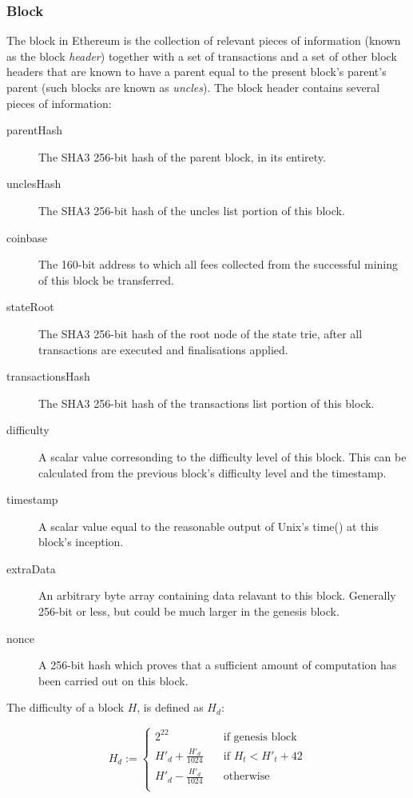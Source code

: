 \documentclass[9pt,oneside]{amsart}
\begin{document}
\begin{multicols}{2}
\subsubsection{Block} \label{ch:block}

The block in Ethereum is the collection of relevant pieces of information (known as the block \textit{header}) together with a set of transactions and a set of other block headers that are known to have a parent equal to the present block's parent's parent (such blocks are known as \textit{uncles}). The block header contains several pieces of information:

\begin{description}
\item[parentHash] The SHA3 256-bit hash of the parent block, in its entirety.
\item[unclesHash] The SHA3 256-bit hash of the uncles list portion of this block.
\item[coinbase] The 160-bit address to which all fees collected from the successful mining of this block be transferred.
\item[stateRoot] The SHA3 256-bit hash of the root node of the state trie, after all transactions are executed and finalisations applied.
\item[transactionsHash] The SHA3 256-bit hash of the transactions list portion of this block.
\item[difficulty] A scalar value corresonding to the difficulty level of this block. This can be calculated from the previous block's difficulty level and the timestamp.
\item[timestamp] A scalar value equal to the reasonable output of Unix's time() at this block's inception.
\item[extraData] An arbitrary byte array containing data relavant to this block. Generally 256-bit or less, but could be much larger in the genesis block.
\item[nonce] A 256-bit hash which proves that a sufficient amount of computation has been carried out on this block.
\end{description}

The difficulty of a block $H$, is defined as $H_d$:

\begin{equation}
H_d :=  \begin{cases}
2^{22} & \quad \text{if genesis block}\\
H'_d + \frac{H'_d}{1024} & \quad \text{if $H_t < H'_t + 42$}\\
H'_d - \frac{H'_d}{1024} & \quad \text{otherwise}\\
\end{cases}
\end{equation}


\end{multicols}
\end{document}
